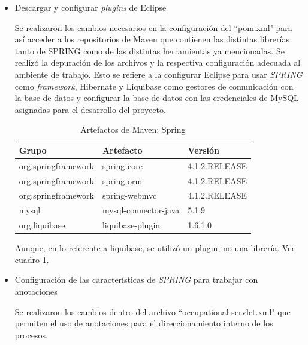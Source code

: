 \begin{enumerate}
\begin{itemize}
           \item Descargar y configurar \textit{plugins} de Eclipse
           
           Se realizaron los cambios necesarios en la configuración del ``pom.xml" para así acceder a los repositorios de Maven que contienen las distintas librerías tanto de SPRING como de las distintas herramientas ya mencionadas. Se realizó la depuración de los archivos y la respectiva configuración adecuada al ambiente de trabajo. Esto se refiere a la configurar Eclipse para usar \textit{SPRING} como \textit{framework}, Hibernate y Liquibase como gestores de comunicación con la base de datos y configurar la base de datos con las credenciales de MySQL asignadas para el desarrollo del proyecto.
           
           \begin{table}[h!]
               
               \begin{center}
                   \begin{tabular}{|l|l|l|}\hline
                       Grupo & Artefacto & Versión \\\hline
                       org.springframework & spring-core & 4.1.2.RELEASE \\\hline
                       org.springframework & spring-orm & 4.1.2.RELEASE \\\hline
                       org.springframework & spring-webmvc & 4.1.2.RELEASE \\\hline
                       mysql & mysql-connector-java & 5.1.9 \\\hline
                       org.liquibase & liquibase-plugin & 1.6.1.0 \\\hline
                    \end{tabular}
                \end{center}
                
                \caption{Artefactos de Maven: Spring}
                \label{artefactos-spring}
           \end{table}
            
           Aunque, en lo referente a liquibase, se utilizó un plugin, no una librería. Ver cuadro \ref{artefactos-spring}.
           
           \item Configuración de las características de \textit{SPRING} para trabajar con anotaciones
           
           Se realizaron los cambios dentro del archivo ``occupational-servlet.xml" que permiten el uso de anotaciones para el direccionamiento interno de los procesos.
           

\end{itemize}
\end{enumerate}
